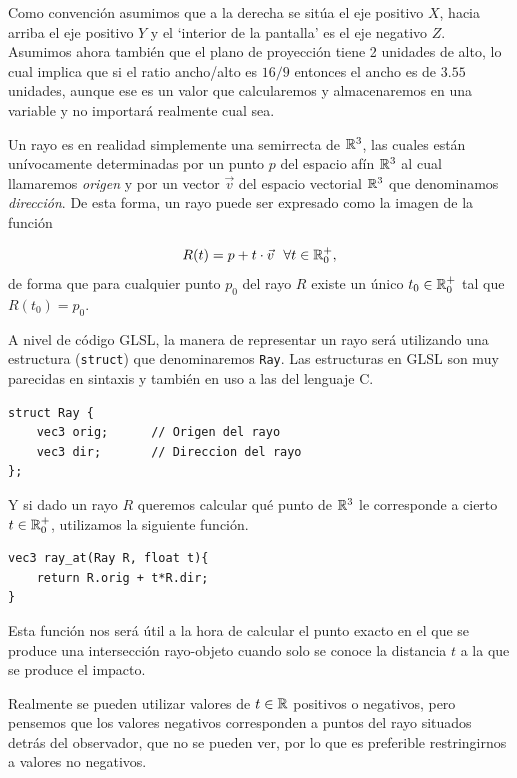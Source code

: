 Como convención asumimos que a la derecha se sitúa el eje positivo $X$, hacia arriba el eje positivo $Y$ y el `interior de la pantalla' es el eje negativo $Z$. Asumimos ahora también que el plano de proyección tiene 2 unidades de alto, lo cual implica que si el ratio ancho/alto es $16/9$ entonces el ancho es de $3.55$ unidades, aunque ese es un valor que calcularemos y almacenaremos en una variable y no importará realmente cual sea.

Un rayo es en realidad simplemente una semirrecta de $\mathbb{R}^3$, las cuales están unívocamente determinadas por un punto $p$ del espacio afín $\mathbb{R}^3$ al cual llamaremos \textit{origen} y por un vector $\vec v$ del espacio vectorial $\mathbb{R}^3$ que denominamos \textit{dirección}. De esta forma, un rayo puede ser expresado como la imagen de la función

$$
R(t) = p + t\cdot \vec v \ \ \forall t\in\mathbb{R}_0^+,
$$
de forma que para cualquier punto $p_0$ del rayo $R$ existe un único $t_0\in\mathbb{R}_0^+$ tal que $R(t_0) = p_0$.

A nivel de código GLSL, la manera de representar un rayo será utilizando una estructura (\verb|struct|) que denominaremos \verb|Ray|. Las estructuras en GLSL son muy parecidas en sintaxis y también en uso a las del lenguaje C. 

\begin{lstlisting}
struct Ray {
    vec3 orig;      // Origen del rayo
    vec3 dir;       // Direccion del rayo
};
\end{lstlisting}

Y si dado un rayo $R$ queremos calcular qué punto de $\mathbb{R}^3$ le corresponde a cierto $t\in\mathbb{R}_0^+$, utilizamos la siguiente función.

\begin{lstlisting}
vec3 ray_at(Ray R, float t){
    return R.orig + t*R.dir;
}
\end{lstlisting}

Esta función nos será útil a la hora de calcular el punto exacto en el que se produce una intersección rayo-objeto cuando solo se conoce la distancia $t$ a la que se produce el impacto.

\begin{observacion}
    Realmente se pueden utilizar valores de $t\in\mathbb{R}$ positivos o negativos, pero pensemos que los valores negativos corresponden a puntos del rayo situados detrás del observador, que no se pueden ver, por lo que es preferible restringirnos a valores no negativos.
\end{observacion}

